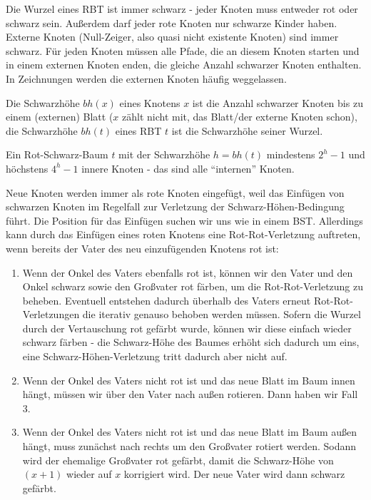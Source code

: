 \documentclass[12pt]{article}
\begin{document}
Die Wurzel eines RBT ist immer schwarz - jeder Knoten muss entweder rot oder schwarz sein. Außerdem darf jeder rote Knoten nur schwarze Kinder haben. Externe Knoten (Null-Zeiger, also quasi nicht existente Knoten) sind immer schwarz. Für jeden Knoten müssen alle Pfade, die an diesem Knoten starten und in einem externen Knoten enden, die gleiche Anzahl schwarzer Knoten enthalten. In Zeichnungen werden die externen Knoten häufig weggelassen.

Die Schwarzhöhe $bh(x)$ eines Knotens $x$ ist die Anzahl schwarzer Knoten bis zu einem (externen) Blatt ($x$ zählt nicht mit, das Blatt/der externe Knoten schon), die Schwarzhöhe $bh(t)$ eines RBT $t$ ist die Schwarzhöhe seiner Wurzel.

Ein Rot-Schwarz-Baum $t$ mit der Schwarzhöhe $h = bh(t)$ mindestens $2^h-1$ und höchstens $4^h-1$ innere Knoten - das sind alle \enquote{internen} Knoten.

Neue Knoten werden immer als rote Knoten eingefügt, weil das Einfügen von schwarzen Knoten im Regelfall zur Verletzung der Schwarz-Höhen-Bedingung führt. Die Position für das Einfügen suchen wir uns wie in einem BST. Allerdings kann durch das Einfügen eines roten Knotens eine Rot-Rot-Verletzung auftreten, wenn bereits der Vater des neu einzufügenden Knotens rot ist:

\begin{enumerate}
\item Wenn der Onkel des Vaters ebenfalls rot ist, können wir den Vater und den Onkel schwarz sowie den Großvater rot färben, um die Rot-Rot-Verletzung zu beheben. Eventuell entstehen dadurch überhalb des Vaters erneut Rot-Rot-Verletzungen die iterativ genauso behoben werden müssen. Sofern die Wurzel durch der Vertauschung rot gefärbt wurde, können wir diese einfach wieder schwarz färben - die Schwarz-Höhe des Baumes erhöht sich dadurch um eins, eine Schwarz-Höhen-Verletzung tritt dadurch aber nicht auf.
\item Wenn der Onkel des Vaters nicht rot ist und das neue Blatt im Baum innen hängt, müssen wir über den Vater nach außen rotieren. Dann haben wir Fall 3.
\item Wenn der Onkel des Vaters nicht rot ist und das neue Blatt im Baum außen hängt, muss zunächst nach rechts um den Großvater rotiert werden. Sodann wird der ehemalige Großvater rot gefärbt, damit die Schwarz-Höhe von $(x+1)$ wieder auf $x$ korrigiert wird. Der neue Vater wird dann schwarz gefärbt.
\end{enumerate}
\end{document}
